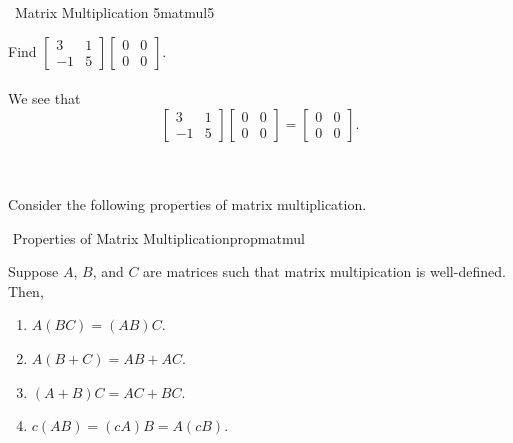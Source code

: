         \begin{example}{\Difficulty\,\Difficulty\,\,Matrix Multiplication 5}{matmul5}
        
            Find \(\begin{bmatrix} 3 & 1 \\ -1 & 5 \end{bmatrix}\begin{bmatrix} 0 & 0 \\ 0 & 0 \end{bmatrix}\).
            \\
            \\
            We see that
            \begin{equation*}
               \begin{bmatrix} 3 & 1 \\ -1 & 5 \end{bmatrix}\begin{bmatrix} 0 & 0 \\ 0 & 0 \end{bmatrix}=\begin{bmatrix} 0 & 0 \\ 0 & 0 \end{bmatrix}.
            \end{equation*}
                
        \end{example}
        \vphantom
        \\
        \\
        Consider the following properties of matrix multiplication.
        \begin{theorem}{\Stop\,\,Properties of Matrix Multiplication}{propmatmul}
        
            Suppose \(A\), \(B\), and \(C\) are matrices such that matrix multipication is well-defined. Then,
            \begin{enumerate}
                \item \(A(BC)=(AB)C\).
                \item \(A(B+C)=AB+AC\).
                \item \((A+B)C=AC+BC\).
                \item \(c(AB)=(cA)B=A(cB)\).
            \end{enumerate}
        
        \end{theorem}
        \pagebreak
        \vphantom
        \\
        \\
